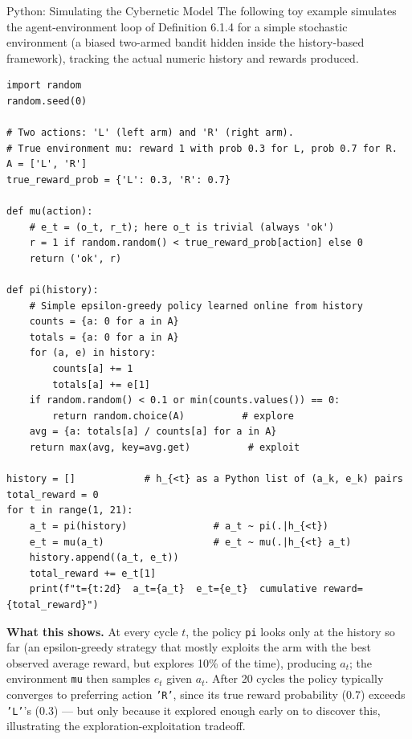 \documentclass[aspectratio=169,10pt]{beamer}
\begin{document}
\begin{frame}[fragile]{Python: Simulating the Cybernetic Model}
The following toy example simulates the agent-environment loop of
Definition 6.1.4 for a simple stochastic environment (a biased two-armed
bandit hidden inside the history-based framework), tracking the actual
numeric history and rewards produced.

\begin{lstlisting}
import random
random.seed(0)

# Two actions: 'L' (left arm) and 'R' (right arm).
# True environment mu: reward 1 with prob 0.3 for L, prob 0.7 for R.
A = ['L', 'R']
true_reward_prob = {'L': 0.3, 'R': 0.7}

def mu(action):
    # e_t = (o_t, r_t); here o_t is trivial (always 'ok')
    r = 1 if random.random() < true_reward_prob[action] else 0
    return ('ok', r)

def pi(history):
    # Simple epsilon-greedy policy learned online from history
    counts = {a: 0 for a in A}
    totals = {a: 0 for a in A}
    for (a, e) in history:
        counts[a] += 1
        totals[a] += e[1]
    if random.random() < 0.1 or min(counts.values()) == 0:
        return random.choice(A)          # explore
    avg = {a: totals[a] / counts[a] for a in A}
    return max(avg, key=avg.get)          # exploit

history = []            # h_{<t} as a Python list of (a_k, e_k) pairs
total_reward = 0
for t in range(1, 21):
    a_t = pi(history)               # a_t ~ pi(.|h_{<t})
    e_t = mu(a_t)                   # e_t ~ mu(.|h_{<t} a_t)
    history.append((a_t, e_t))
    total_reward += e_t[1]
    print(f"t={t:2d}  a_t={a_t}  e_t={e_t}  cumulative reward={total_reward}")
\end{lstlisting}

\textbf{What this shows.} At every cycle $t$, the policy \texttt{pi} looks
only at the history so far (an epsilon-greedy strategy that mostly exploits
the arm with the best observed average reward, but explores 10\% of the
time), producing $a_t$; the environment \texttt{mu} then samples $e_t$
given $a_t$. After 20 cycles the policy typically converges to preferring
action \texttt{'R'}, since its true reward probability (0.7) exceeds
\texttt{'L'}'s (0.3) --- but only because it explored enough early on to
discover this, illustrating the exploration-exploitation tradeoff.
\end{frame}

\end{document}
